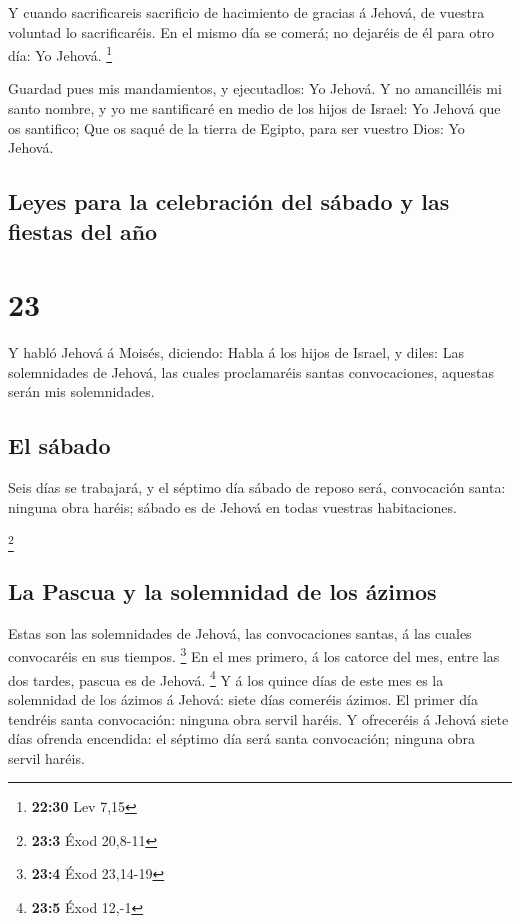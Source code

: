  Y cuando sacrificareis sacrificio de hacimiento de gracias
á Jehová, de vuestra voluntad lo sacrificaréis.  En el
mismo día se comerá; no dejaréis de él para otro día: Yo Jehová.
\footnote{\textbf{22:30} Lev 7,15}

 Guardad pues mis mandamientos, y ejecutadlos: Yo Jehová.
 Y no amancilléis mi santo nombre, y yo me santificaré en
medio de los hijos de Israel: Yo Jehová que os santifico; 
Que os saqué de la tierra de Egipto, para ser vuestro Dios: Yo Jehová.

\hypertarget{leyes-para-la-celebraciuxf3n-del-suxe1bado-y-las-fiestas-del-auxf1o}{%
\subsection{Leyes para la celebración del sábado y las fiestas del
año}\label{leyes-para-la-celebraciuxf3n-del-suxe1bado-y-las-fiestas-del-auxf1o}}

\hypertarget{section-22}{%
\section{23}\label{section-22}}

 Y habló Jehová á Moisés, diciendo:  Habla á los
hijos de Israel, y diles: Las solemnidades de Jehová, las cuales
proclamaréis santas convocaciones, aquestas serán mis solemnidades.

\hypertarget{el-suxe1bado}{%
\subsection{El sábado}\label{el-suxe1bado}}

 Seis días se trabajará, y el séptimo día sábado de reposo
será, convocación santa: ninguna obra haréis; sábado es de Jehová en
todas vuestras habitaciones.

\footnote{\textbf{23:3} Éxod 20,8-11}

\hypertarget{la-pascua-y-la-solemnidad-de-los-uxe1zimos}{%
\subsection{La Pascua y la solemnidad de los
ázimos}\label{la-pascua-y-la-solemnidad-de-los-uxe1zimos}}

 Estas son las solemnidades de Jehová, las convocaciones
santas, á las cuales convocaréis en sus tiempos. \footnote{\textbf{23:4}
  Éxod 23,14-19}  En el mes primero, á los catorce del mes,
entre las dos tardes, pascua es de Jehová. \footnote{\textbf{23:5} Éxod
  12,-1}  Y á los quince días de este mes es la solemnidad
de los ázimos á Jehová: siete días comeréis ázimos.  El
primer día tendréis santa convocación: ninguna obra servil haréis.
 Y ofreceréis á Jehová siete días ofrenda encendida: el
séptimo día será santa convocación; ninguna obra servil haréis.


